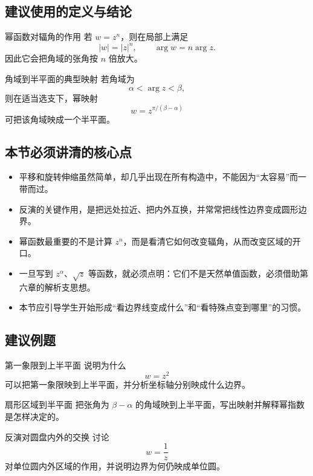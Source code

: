 \subsection*{建议使用的定义与结论}
\begin{dingli}{幂函数对辐角的作用}{}
若 $w=z^n$，则在局部上满足
\[
    |w|=|z|^n,
    \qquad
    \arg w=n\arg z.
\]
因此它会把角域的张角按 $n$ 倍放大。
\end{dingli}

\begin{dingli}{角域到半平面的典型映射}{}
若角域为
\[
    \alpha<\arg z<\beta,
\]
则在适当选支下，幂映射
\[
    w=z^{\pi/(\beta-\alpha)}
\]
可把该角域映成一个半平面。
\end{dingli}

\subsection*{本节必须讲清的核心点}
\begin{itemize}
    \item 平移和旋转伸缩虽然简单，却几乎出现在所有构造中，不能因为``太容易''而一带而过。
    \item 反演的关键作用，是把远处拉近、把内外互换，并常常把线性边界变成圆形边界。
    \item 幂函数最重要的不是计算 $z^n$，而是看清它如何改变辐角，从而改变区域的开口。
    \item 一旦写到 $z^\alpha$、$\sqrt{z}$ 等函数，就必须点明：它们不是天然单值函数，必须借助第六章的解析支思想。
    \item 本节应引导学生开始形成``看边界线变成什么''和``看特殊点变到哪里''的习惯。
\end{itemize}

\subsection*{建议例题}
\begin{lizi}{第一象限到上半平面}{}
说明为什么
\[
    w=z^2
\]
可以把第一象限映到上半平面，并分析坐标轴分别映成什么边界。
\end{lizi}

\begin{lizi}{扇形区域到半平面}{}
把张角为 $\beta-\alpha$ 的角域映到上半平面，写出映射并解释幂指数是怎样决定的。
\end{lizi}

\begin{lizi}{反演对圆盘内外的交换}{}
讨论
\[
    w=\frac{1}{z}
\]
对单位圆内外区域的作用，并说明边界为何仍映成单位圆。
\end{lizi}

